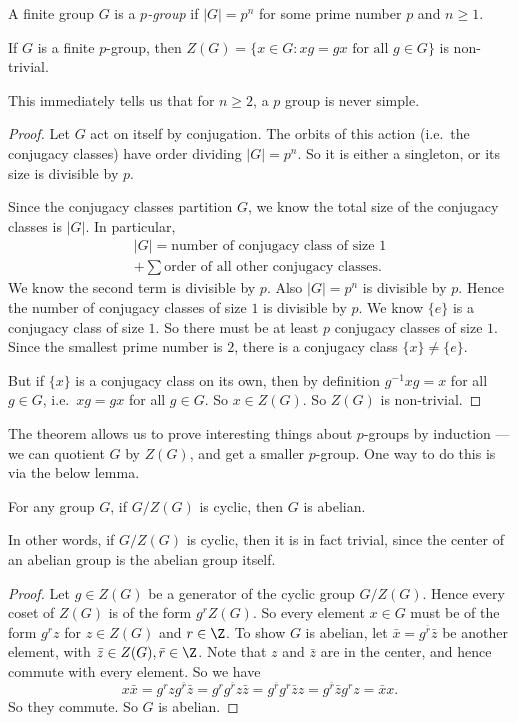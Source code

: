 \documentclass[a4paper]{article}
\begin{document}
\begin{defi}[$p$-group]
  A finite group $G$ is a \emph{$p$-group} if $|G| = p^n$ for some prime number $p$ and $n \geq 1$.
\end{defi}

\begin{thm}
  If $G$ is a finite $p$-group, then $Z(G) = \{x \in G: xg = gx\text{ for all }g \in G\}$ is non-trivial.
\end{thm}
This immediately tells us that for $n \geq 2$, a $p$ group is never simple.

\begin{proof}
  Let $G$ act on itself by conjugation. The orbits of this action (i.e.\ the conjugacy classes) have order dividing $|G| = p^n$. So it is either a singleton, or its size is divisible by $p$.

  Since the conjugacy classes partition $G$, we know the total size of the conjugacy classes is $|G|$. In particular,
  \begin{multline*}
    |G| = \text{number of conjugacy class of size 1} \\
    + \sum \text{order of all other conjugacy classes}.
  \end{multline*}
  We know the second term is divisible by $p$. Also $|G| = p^n$ is divisible by $p$. Hence the number of conjugacy classes of size $1$ is divisible by $p$. We know $\{e\}$ is a conjugacy class of size $1$. So there must be at least $p$ conjugacy classes of size $1$. Since the smallest prime number is $2$, there is a conjugacy class $\{x\} \not= \{e\}$.

  But if $\{x\}$ is a conjugacy class on its own, then by definition $g^{-1}xg = x$ for all $g \in G$, i.e.\ $xg = gx$ for all $g \in G$. So $x \in Z(G)$. So $Z(G)$ is non-trivial.
\end{proof}
The theorem allows us to prove interesting things about $p$-groups by induction --- we can quotient $G$ by $Z(G)$, and get a smaller $p$-group. One way to do this is via the below lemma.

\begin{lemma}
  For any group $G$, if $G/Z(G)$ is cyclic, then $G$ is abelian.

  In other words, if $G/Z(G)$ is cyclic, then it is in fact trivial, since the center of an abelian group is the abelian group itself.
\end{lemma}

\begin{proof}
  Let $g \in Z(G)$ be a generator of the cyclic group $G/Z(G)$. Hence every coset of $Z(G)$ is of the form $g^rZ(G)$. So every element $x \in G$ must be of the form $g^r z$ for $z \in Z(G)$ and $r \in \Z$. To show $G$ is abelian, let $\bar{x} = g^{\bar{r}} \bar{z}$ be another element, with $\bar{z} \in Z(G), \bar{r} \in \Z$. Note that $z$ and $\bar{z}$ are in the center, and hence commute with every element. So we have
  \[
    x\bar{x} = g^r z g^{\bar{r}} \bar{z} = g^r g^{\bar{r}} z \bar{z} = g^{\bar{r}}g^r \bar{z} z = g^{\bar{r}}\bar{z} g^r z = \bar{x} x.
  \]
  So they commute. So $G$ is abelian.
\end{proof}
\end{document}
